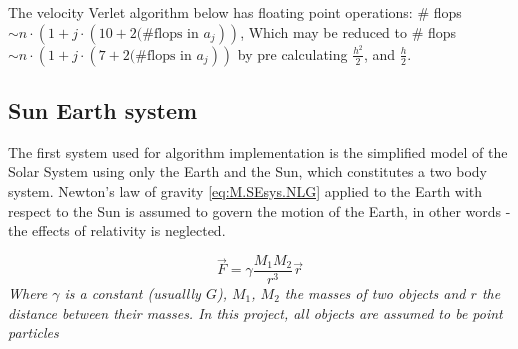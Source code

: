 \documentclass[%
oneside,                 %
final,                   %
10pt]{article}
\begin{document}
The velocity Verlet algorithm below has floating point operations: \newline
\# flops$\sim n \cdot (1+j \cdot (10+2\text{(\#flops in } a_j))$, 
Which may be reduced to \# flops$\sim n \cdot (1+j \cdot (7+2\text{(\#flops in } a_j))$ by pre calculating $\frac{h^2}{2}$, and $ \frac{h}{2}$.
\begin{center}\end{center}
  
  
  
\subsection{Sun Earth system}                                                                                                               
The first system used for algorithm implementation is the simplified model of the Solar System using only the Earth and the Sun, which constitutes a two body system. Newton's law of gravity \eqref{eq:M.SEsys.NLG} applied to the Earth with respect to the Sun  is assumed to govern the motion of the Earth, in other words - the effects of relativity is neglected. \newline


\begin{equation}
\vec{F}=\gamma \frac{M_1 M_2}{r^3}\vec{r}
\label{eq:M.SEsys.NLG}
\end{equation} 
\textit{Where $\gamma$ is a constant (usuallly $G$), $M_1$, $M_2$  the masses of two objects and $r$ the distance between their masses. In this project, all objects are assumed to be point particles} \newline
\end{document}
